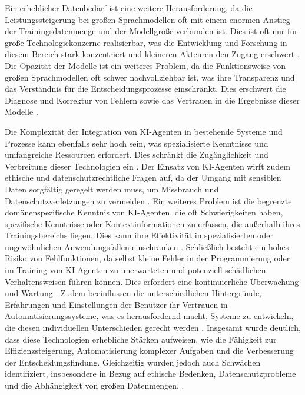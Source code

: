 \documentclass[conference]{IEEEtran}
\begin{document}
Ein erheblicher Datenbedarf ist eine weitere Herausforderung, da die Leistungssteigerung bei großen Sprachmodellen oft mit einem enormen Anstieg der Trainingsdatenmenge und der Modellgröße verbunden ist. Dies ist oft nur für große Technologiekonzerne realisierbar, was die Entwicklung und Forschung in diesem Bereich stark konzentriert und kleineren Akteuren den Zugang erschwert  \cite{noauthor_agentgpt_nodate}.
Die Opazität der Modelle ist ein weiteres Problem, da die Funktionsweise von großen Sprachmodellen oft schwer nachvollziehbar ist, was ihre Transparenz und das Verständnis für die Entscheidungsprozesse einschränkt. Dies erschwert die Diagnose und Korrektur von Fehlern sowie das Vertrauen in die Ergebnisse dieser Modelle  \cite{lappin_assessing_2024}.

Die Komplexität der Integration von KI-Agenten in bestehende Systeme und Prozesse kann ebenfalls sehr hoch sein, was spezialisierte Kenntnisse und umfangreiche Ressourcen erfordert. Dies schränkt die Zugänglichkeit und Verbreitung dieser Technologien ein \cite{lappin_assessing_2024}.
Der Einsatz von KI-Agenten wirft zudem ethische und datenschutzrechtliche Fragen auf, da der Umgang mit sensiblen Daten sorgfältig geregelt werden muss, um Missbrauch und Datenschutzverletzungen zu vermeiden \cite{noauthor_was_nodate}. Ein weiteres Problem ist die begrenzte domänenspezifische Kenntnis von KI-Agenten, die oft Schwierigkeiten haben, spezifische Kenntnisse oder Kontextinformationen zu erfassen, die außerhalb ihres Trainingsbereichs liegen. Dies kann ihre Effektivität in spezialisierten oder ungewöhnlichen Anwendungsfällen einschränken \cite{v-hanki_was_2023}.
Schließlich besteht ein hohes Risiko von Fehlfunktionen, da selbst kleine Fehler in der Programmierung oder im Training von KI-Agenten zu unerwarteten und potenziell schädlichen Verhaltensweisen führen können. Dies erfordert eine kontinuierliche Überwachung und Wartung \cite{dagher_evolution_2023}.
Zudem beeinflussen die unterschiedlichen Hintergründe, Erfahrungen und Einstellungen der Benutzer ihr Vertrauen in Automatisierungssysteme, was es herausfordernd macht, Systeme zu entwickeln, die diesen individuellen Unterschieden gerecht werden \cite{lappin_assessing_2024}.
Insgesamt wurde deutlich, dass diese Technologien erhebliche Stärken aufweisen, wie die Fähigkeit zur Effizienzsteigerung, Automatisierung komplexer Aufgaben und die Verbesserung der Entscheidungsfindung. Gleichzeitig wurden jedoch auch Schwächen identifiziert, insbesondere in Bezug auf ethische Bedenken, Datenschutzprobleme und die Abhängigkeit von großen Datenmengen. \cite{noauthor_trust_nodate}.
\end{document}
